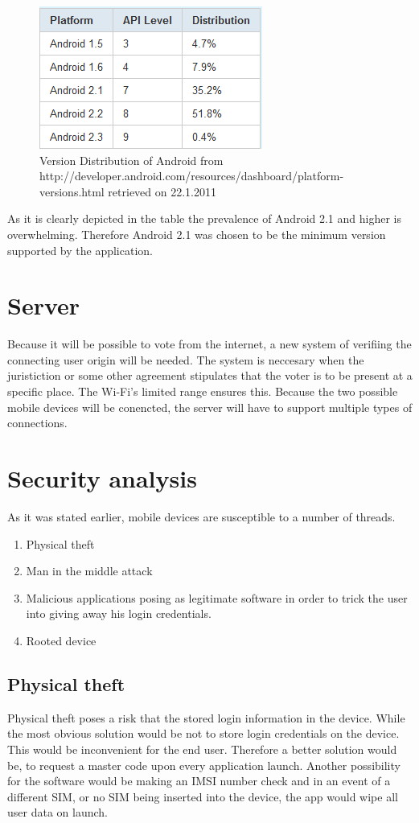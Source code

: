 \documentclass[11pt,twoside,a4paper]{book}
\begin{document}
\begin{figure}[h]
\begin{center}
\includegraphics[scale=1]{figures/VersionDistribution.PNG} 
\caption{Version Distribution of Android \cite{goodevver} from http://developer.android.com/resources/dashboard/platform-versions.html retrieved on 22.1.2011  }
\label{fig:versions}
\end{center}
\end{figure}


As it is clearly depicted in the table the prevalence of Android 2.1 and higher is overwhelming. Therefore Android 2.1 was chosen to be the minimum version supported by the application.

\section{Server}
Because it will be possible to vote from the internet, a new system of verifiing the connecting user origin will be needed. The system is neccesary when the juristiction or some other agreement stipulates that the voter is to be present at a specific place. The Wi-Fi's limited range ensures this. Because the two possible mobile devices will be conencted, the server will have to support multiple types of connections.
\section{Security analysis}
As it was stated earlier, mobile devices are susceptible to a number of threads. 
\begin{enumerate}
\item Physical theft
\item Man in the middle attack
\item Malicious applications posing as legitimate software in order to trick the user into giving away his login credentials.
\item Rooted device
\end{enumerate}
\subsection{Physical theft}
Physical theft poses a risk that the stored login information in the device. While the most obvious solution would be not to store login credentials on the device. This would be inconvenient for the end user. Therefore a better solution would be, to request a master code upon every application launch. Another possibility for the software would be making an IMSI number check and in an event of a different SIM, or no SIM being inserted into the device, the app would wipe all user data on launch. 
\end{document}
